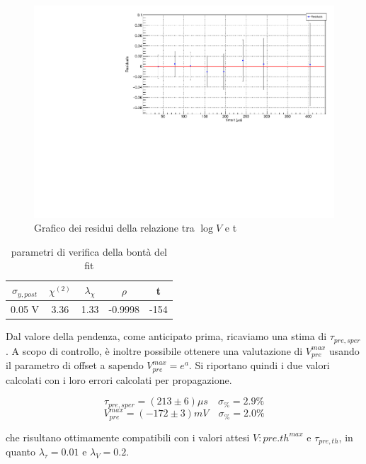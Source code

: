 \documentclass{article}
\begin{document}
\begin{center}
\begin{figure}[H]
\centering
\includegraphics[scale=0.4, angle=0]{preampRCresidui.pdf}
\caption{Grafico dei residui della relazione tra $\log V$ e t}
\label{fig:QinvsVpre}
\end{figure}
\end{center}

\begin{table}[ht]
    \centering
    \begin{tabular}{ccccc}
        \toprule
        $\sigma_{y, post}$    &$\chi^{(2)}$    &$\lambda_{\chi}$   &$\rho$ &t   \\
        \midrule
        0.05 V                &3.36            &1.33               &-0.9998&-154\\
        \bottomrule
    \end{tabular}
    \caption{parametri di verifica della bontà del fit}
\end{table}

Dal valore della pendenza, come anticipato prima, ricaviamo una stima di $\tau_{pre,sper}$. A scopo di controllo, è inoltre possibile 
ottenere una valutazione di $V_{pre}^{max}$ usando il parametro di offset a sapendo $V_{pre}^{max} = e^a$. Si riportano quindi i due
valori calcolati con i loro errori calcolati per propagazione.

\[
\tau_{pre,sper} = (213 \pm 6)\mu s \quad \sigma_{\%} = 2.9 \%    
\]
\[
V_{pre}^{max} = (-172 \pm 3)mV \quad \sigma_{\%} = 2.0 \%    
\]

che risultano ottimamente compatibili con i valori attesi $V:{pre.th}^{max}$ e $\tau_{pre,th}$, in quanto $\lambda_{\tau} = 0.01$
e $\lambda_{V}=0.2$.
\end{document}

